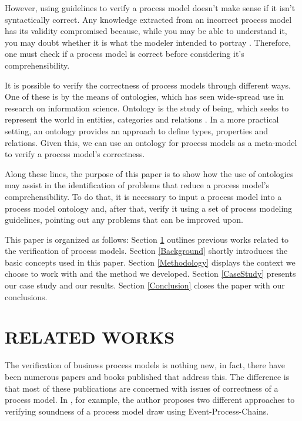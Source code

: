 \documentclass[a4paper,twoside]{article}
\begin{document}
However, using guidelines to verify a process model doesn't make sense if it isn't syntactically correct. Any knowledge extracted from an incorrect process model has its validity compromised because, while you may be able to understand it, you may doubt whether it is what the modeler intended to portray \cite{Reijers2015}. Therefore, one must check if a process model is correct before considering it's comprehensibility.


It is possible to verify the correctness of process models through different ways. One of these is by the means of ontologies, which has seen wide-spread use in research on information science. Ontology is the study of being, which seeks to represent the world in entities, categories and relations \cite{Mendling2008}. In a more practical setting, an ontology provides an approach to define types, properties and relations. Given this, we can use an ontology for process models as a meta-model to verify a process model's correctness.


Along these lines, the purpose of this paper is to show how the use of ontologies may assist in the identification of problems that reduce a process model's comprehensibility. To do that, it is necessary to input a process model into a process model ontology and, after that, verify it using a set of process modeling guidelines, pointing out any problems that can be improved upon.


This paper is organized as follows: Section \ref{RelatedWorks} outlines previous works related to the verification of process models. Section \ref{Background} shortly introduces the basic concepts used in this paper. Section \ref{Methodology} displays the context we choose to work with and the method we developed. Section \ref{CaseStudy} presents our case study and our results. Section \ref{Conclusion} closes the paper with our conclusions.

\section{RELATED WORKS}\label{RelatedWorks}


\noindent The verification of business process models is nothing new, in fact, there have been numerous papers and books published that address this. The difference is that most of these publications are concerned with issues of correctness of a process model. In \cite{Mendling2008}, for example, the author proposes two different approaches to verifying soundness of a process model draw using Event-Process-Chains.
	
\end{document}
